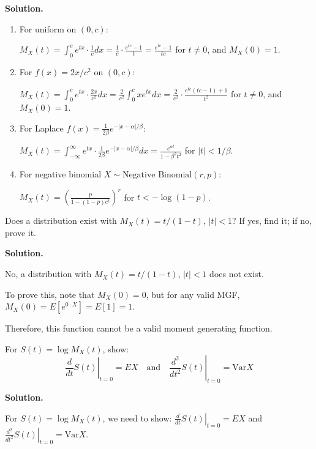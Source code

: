 \noindent\textbf{Solution.}
\begin{enumerate}[label=(\alph*)]
    \item For uniform on $(0,c)$:
    
    $M_X(t) = \int_0^c e^{tx} \cdot \frac{1}{c}dx = \frac{1}{c} \cdot \frac{e^{tc}-1}{t} = \frac{e^{tc}-1}{tc}$ for $t \neq 0$, and $M_X(0) = 1$.
    
    \item For $f(x)=2x/c^2$ on $(0,c)$:
    
    $M_X(t) = \int_0^c e^{tx} \cdot \frac{2x}{c^2}dx = \frac{2}{c^2} \int_0^c xe^{tx}dx = \frac{2}{c^2} \cdot \frac{e^{tc}(tc-1)+1}{t^2}$ for $t \neq 0$, and $M_X(0) = 1$.
    
    \item For Laplace $f(x)=\frac{1}{2\beta}e^{-|x-\alpha|/\beta}$:
    
    $M_X(t) = \int_{-\infty}^{\infty} e^{tx} \cdot \frac{1}{2\beta}e^{-|x-\alpha|/\beta}dx = \frac{e^{\alpha t}}{1-\beta^2 t^2}$ for $|t| < 1/\beta$.
    
    \item For negative binomial $X \sim \text{Negative Binomial}(r,p)$:
    
    $M_X(t) = \left(\frac{p}{1-(1-p)e^t}\right)^r$ for $t < -\log(1-p)$.
\end{enumerate}

\begin{problembox}
Does a distribution exist with $M_X(t)=t/(1-t)$, $|t|<1$? If yes, find it; if no, prove it.
\end{problembox}

\noindent\textbf{Solution.}

No, a distribution with $M_X(t)=t/(1-t)$, $|t|<1$ does not exist.

To prove this, note that $M_X(0) = 0$, but for any valid MGF, $M_X(0) = E[e^{0 \cdot X}] = E[1] = 1$.

Therefore, this function cannot be a valid moment generating function.

\begin{problembox}
For $S(t)=\log M_X(t)$, show:
\[ \left.\frac{d}{dt}S(t)\right|_{t=0} = EX \quad\text{and}\quad \left.\frac{d^2}{dt^2}S(t)\right|_{t=0} = \text{Var}X \]
\end{problembox}

\noindent\textbf{Solution.}

For $S(t)=\log M_X(t)$, we need to show:
$\left.\frac{d}{dt}S(t)\right|_{t=0} = EX$ and $\left.\frac{d^2}{dt^2}S(t)\right|_{t=0} = \text{Var}X$.

